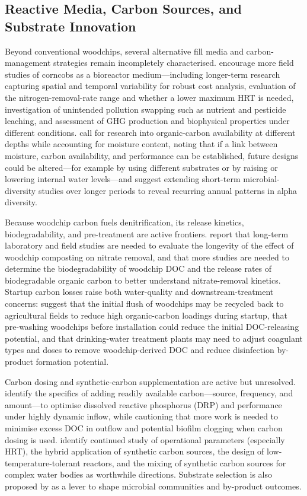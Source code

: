 \subsection{Reactive Media, Carbon Sources, and Substrate Innovation}
Beyond conventional woodchips, several alternative fill media and carbon-management strategies remain incompletely characterised. \textcite{Law2023} encourage more field studies of corncobs as a bioreactor medium---including longer-term research capturing spatial and temporal variability for robust cost analysis, evaluation of the nitrogen-removal-rate range and whether a lower maximum HRT is needed, investigation of unintended pollution swapping such as nutrient and pesticide leaching, and assessment of GHG production and biophysical properties under different conditions. \textcite{Porter2015} call for research into organic-carbon availability at different depths while accounting for moisture content, noting that if a link between moisture, carbon availability, and performance can be established, future designs could be altered---for example by using different substrates or by raising or lowering internal water levels---and suggest extending short-term microbial-diversity studies over longer periods to reveal recurring annual patterns in alpha diversity.

Because woodchip carbon fuels denitrification, its release kinetics, biodegradability, and pre-treatment are active frontiers. \textcite{Kouanda2021} report that long-term laboratory and field studies are needed to evaluate the longevity of the effect of woodchip composting on nitrate removal, and that more studies are needed to determine the biodegradability of woodchip DOC and the release rates of biodegradable organic carbon to better understand nitrate-removal kinetics. Startup carbon losses raise both water-quality and downstream-treatment concerns: \textcite{Abusallout2017} suggest that the initial flush of woodchips may be recycled back to agricultural fields to reduce high organic-carbon loadings during startup, that pre-washing woodchips before installation could reduce the initial DOC-releasing potential, and that drinking-water treatment plants may need to adjust coagulant types and doses to remove woodchip-derived DOC and reduce disinfection by-product formation potential.

Carbon dosing and synthetic-carbon supplementation are active but unresolved. \textcite{Rivas2020} identify the specifics of adding readily available carbon---source, frequency, and amount---to optimise dissolved reactive phosphorus (DRP) and performance under highly dynamic inflow, while cautioning that more work is needed to minimise excess DOC in outflow and potential biofilm clogging when carbon dosing is used. \textcite{Zhang2021b} identify continued study of operational parameters (especially HRT), the hybrid application of synthetic carbon sources, the design of low-temperature-tolerant reactors, and the mixing of synthetic carbon sources for complex water bodies as worthwhile directions. Substrate selection is also proposed by \textcite{Hartfiel2022} as a lever to shape microbial communities and by-product outcomes.

